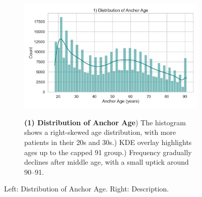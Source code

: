 \documentclass[12pt,a4paper]{report}
\begin{document}
\begin{figure}[ht!]
    \centering
    \begin{subfigure}{0.42\textwidth}
        \includegraphics[width=\linewidth]{mimic_plots/plot1.jpg}
    \end{subfigure}\hfill
    \begin{subfigure}{0.54\textwidth}
        \footnotesize
        \textbf{(1) Distribution of Anchor Age}) The histogram shows a right-skewed age distribution, with more patients in their 20s and 30s.) KDE overlay highlights ages up to the capped 91 group.) Frequency gradually declines after middle age, with a small uptick around 90--91.
    \end{subfigure}
    \caption{Left: Distribution of Anchor Age. Right: Description.}
    \label{fig:plot1}
\end{figure}
\end{document}
